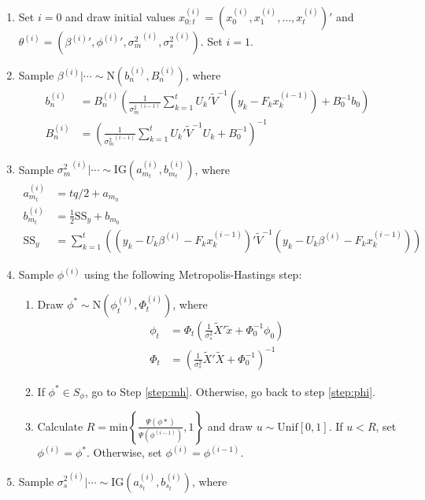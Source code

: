 \documentclass{article}
\begin{document}
\begin{enumerate}
\item Set $i = 0$ and draw initial values $x_{0:t}^{(i)} = \left(x_0^{(i)},x_1^{(i)},\ldots,x_t^{(i)}\right)'$ and $\theta^{(i)} = \left({\beta^{(i)}}', {\phi^{(i)}}', {\sigma^2_m}^{(i)}, {\sigma^2_s}^{(i)}\right)$. Set $i = 1$.
\item Sample $\beta^{(i)}|\cdots \sim \mbox{N}(b_n^{(i)}, B_n^{(i)})$, where
\begin{align*}
b_n^{(i)} &= B_n^{(i)}\left(\frac{1}{{\sigma^2_m}^{(i-1)}} \sum^t_{k=1} U_k'\tilde{V}^{-1}(y_k - F_kx_k^{(i-1)}) + B_0^{-1}b_0\right) \\
B_n^{(i)} &= \left(\frac{1}{{\sigma^2_m}^{(i-1)}} \sum^t_{k=1} U_k'\tilde{V}^{-1}U_k + B_0^{-1}\right)^{-1}
\end{align*}
\item Sample ${\sigma^2_m}^{(i)}|\cdots \sim \mbox{IG}(a_{m_t}^{(i)}, b_{m_t}^{(i)})$, where
\begin{align*}
a_{m_t}^{(i)} &= tq/2 + a_{m_0} \\
b_{m_t}^{(i)} &= \frac{1}{2}\mbox{SS}_y + b_{m_0} \\
\mbox{SS}_y &= \sum^t_{k=1} \left((y_k - U_k\beta^{(i)} - F_kx_k^{(i-1)})'\tilde{V}^{-1}(y_k - U_k\beta^{(i)} - F_kx_k^{(i-1)})\right)
\end{align*}
\item Sample $\phi^{(i)}$ using the following Metropolis-Hastings step:
\begin{enumerate}
\item Draw $\phi^* \sim \mbox{N}(\phi_t^{(i)},\Phi_t^{(i)})$, where
\begin{align*}
\phi_t &= \Phi_t\left(\frac{1}{\sigma^2_s} \tilde{X}'\tilde{x} + \Phi_0^{-1}\phi_0\right) \\
\Phi_t &= \left(\frac{1}{\sigma^2_s} \tilde{X}'\tilde{X} + \Phi_0^{-1}\right)^{-1}
\end{align*} \label{step:phi}
\item If $\phi^* \in S_{\phi}$, go to Step \ref{step:mh}. Otherwise, go back to step \ref{step:phi}.
\item Calculate $R = \mbox{min}\left\{\frac{\Psi(\phi*)}{\Psi(\phi^{(i-1)})}, 1\right\}$ and draw $u \sim \mbox{Unif}[0,1]$. If $u < R$, set $\phi^{(i)} = \phi^*$. Otherwise, set $\phi^{(i)} = \phi^{(i-1)}$. \label{step:mh}
\end{enumerate}
\item Sample ${\sigma^2_s}^{(i)}|\cdots \sim \mbox{IG}(a_{s_t}^{(i)}, b_{s_t}^{(i)})$, where
\begin{align*}

\end{align*}
\end{enumerate}
\end{document}
